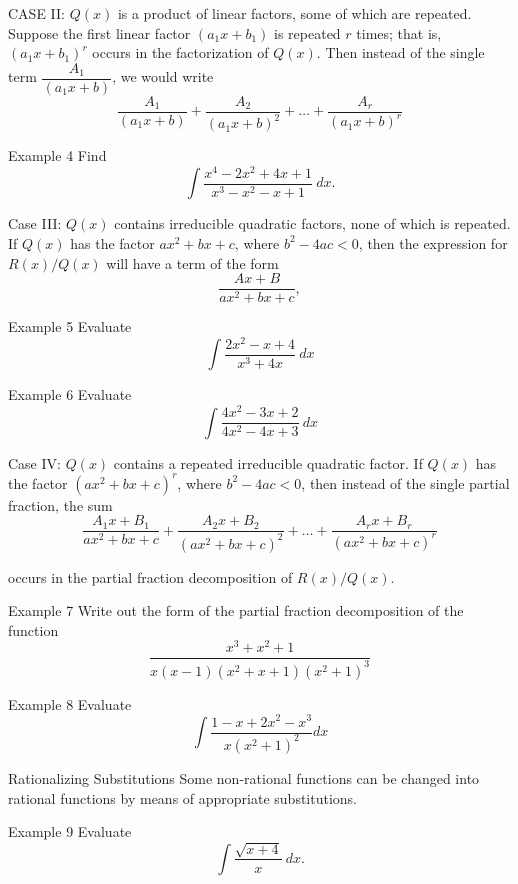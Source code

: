 \documentclass{beamer}
\begin{document}
\begin{frame}{CASE II: \(Q(x)\) is a product of linear factors, some of which are repeated.}
Suppose the first linear factor \((a_1 x+b_1)\) is repeated \(r\) times; that is, \((a_1 x +b_1)^r\) occurs in the factorization of \(Q(x)\). Then instead of the single term \(\dfrac{A_1}{(a_1 x+b)}\), we would write 
\[\dfrac{A_1}{(a_1 x+b)}+\dfrac{A_2}{(a_1 x+b)^2}+\dots + \dfrac{A_r}{(a_1 x+b)^r}\]
\end{frame}

\begin{frame}{Example 4}
Find \[\int \dfrac{x^4 -2x^2 +4x +1}{x^3 -x^2 -x+1}~dx.\]
\end{frame}

\begin{frame}{Case III: \(Q(x)\) contains irreducible quadratic factors, none of which is repeated. }
If \(Q(x)\) has the factor \(ax^2 +bx +c\), where \(b^2 -4ac <0\), then the expression for \(R(x)/Q(x)\) will have a term of the form \[\dfrac{Ax+B}{ax^2 +bx +c},\] 
\end{frame}

\begin{frame}{Example 5}
Evaluate \[\int \dfrac{2x^2 -x +4}{x^3+4x}~dx\]
\end{frame}

\begin{frame}{Example 6}
Evaluate \[\int \dfrac{4x^2 -3x +2}{4x^2-4x+3}~dx\]
\end{frame}

\begin{frame}{Case IV: \(Q(x)\) contains a repeated irreducible quadratic factor.}
If \(Q(x)\) has the factor \((ax^2+bx+c)^r\), where \(b^2 -4ac<0\), then instead of the single partial fraction, the sum \[\dfrac{A_1x +B_1}{ax^2+bx+c}+\dfrac{A_2x +B_2}{(ax^2+bx+c)^2}+\dots+\dfrac{A_rx +B_r}{(ax^2+bx+c)^r}\]

occurs in the partial fraction decomposition of \(R(x)/Q(x)\).
\end{frame}

\begin{frame}{Example 7}
Write out the form of the partial fraction decomposition of the function \[
\dfrac{x^3 +x^2 +1}{x(x-1)(x^2+x+1)(x^2+1)^3}
\]
\end{frame}

\begin{frame}{Example 8}
Evaluate \[
\int \dfrac{1-x+2x^2-x^3}{x(x^2+1)^2}dx
\]
\end{frame}

\begin{frame}{Rationalizing Substitutions}
Some non-rational functions can be changed into rational functions by means of appropriate substitutions. 
\begin{block}{Example 9}
Evaluate \[\int \dfrac{\sqrt{x+4}}{x}~dx.\]
\end{block}
\end{frame}
\end{document}
